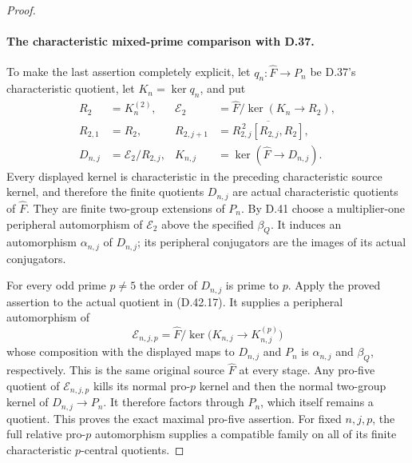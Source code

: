 \begin{proof}
\paragraph{The characteristic mixed-prime comparison with D.37.}
To make the last assertion completely
explicit, let \(q_n:\widehat F\to P_n\)
be D.37's characteristic quotient,
let \(K_n=\ker q_n\), and put
\[
 \begin{aligned}
 R_2&=K_n^{(2)},&
 \mathcal E_2&=\widehat F/\ker(K_n\to R_2),\\
 R_{2,1}&=R_2,&
 R_{2,j+1}&=\overline{R_{2,j}^{\,2}[R_{2,j},R_2]},\\
 D_{n,j}&=\mathcal E_2/R_{2,j},&
 K_{n,j}&=\ker(\widehat F\to D_{n,j}).
 \end{aligned}
 \tag{D.42.17}
\]
Every displayed kernel is characteristic
in the preceding characteristic source
kernel, and therefore the finite
quotients \(D_{n,j}\) are actual
characteristic quotients of \(\widehat F\).
They are finite two-group extensions
of \(P_n\).
By D.41 choose a multiplier-one
peripheral automorphism of
\(\mathcal E_2\) above the specified
\(\beta_Q\).
It induces an automorphism
\(\alpha_{n,j}\) of \(D_{n,j}\);
its peripheral conjugators are the
images of its actual conjugators.

For every odd prime \(p\ne5\) the
order of \(D_{n,j}\) is prime to \(p\).
Apply the proved assertion to the
actual quotient in \textup{(D.42.17)}.
It supplies a peripheral automorphism
of
\[
 \mathcal E_{n,j,p}
   =\widehat F/
      \ker\bigl(K_{n,j}\to K_{n,j}^{(p)}\bigr)
 \tag{D.42.18}
\]
whose composition with the displayed
maps to \(D_{n,j}\) and \(P_n\)
is \(\alpha_{n,j}\) and \(\beta_Q\),
respectively.
This is the same original source
\(\widehat F\) at every stage.
Any pro-five quotient of
\(\mathcal E_{n,j,p}\) kills its
normal pro-\(p\) kernel and then the
normal two-group kernel of
\(D_{n,j}\to P_n\).
It therefore factors through \(P_n\),
which itself remains a quotient.
This proves the exact maximal
pro-five assertion.
For fixed \(n,j,p\), the full relative
pro-\(p\) automorphism supplies a
compatible family on all of its
finite characteristic \(p\)-central
quotients.
\end{proof}

